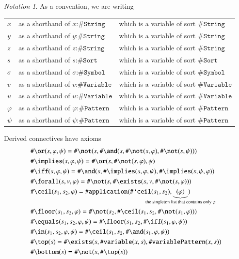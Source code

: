 \documentclass[UTF8,11pt]{article}
\newcounter{thmcounter}
\theoremstyle{plain}
\theoremstyle{definition}
\theoremstyle{remark}
\newtheorem{notation}   [thmcounter]{Notation}
\newcommand{\cln}{\texttt{:}}
\newcommand{\sharpsymbol}{\#}
\newcommand{\KString}{\texttt{\sharpsymbol String}}
\newcommand{\KSort}{\texttt{\sharpsymbol Sort}}
\newcommand{\KSymbol}{\texttt{\sharpsymbol Symbol}}
\newcommand{\KSymbolceil}{\texttt{\sharpsymbol `ceil}}
\newcommand{\KVariable}{\texttt{\sharpsymbol Variable}}
\newcommand{\KvariablePattern}{\texttt{\sharpsymbol variablePattern}}
\newcommand{\KPattern}{\texttt{\sharpsymbol Pattern}}
\newcommand{\Kvariable}{\texttt{\sharpsymbol variable}}
\newcommand{\Kand}{\texttt{\sharpsymbol  \slashsymbol and}}
\newcommand{\Kor}{\texttt{\sharpsymbol \slashsymbol  or}}
\newcommand{\Kimplies}{\texttt{\sharpsymbol  \slashsymbol implies}}
\newcommand{\Kiff}{\texttt{\sharpsymbol  \slashsymbol iff}}
\newcommand{\Knot}{\texttt{\sharpsymbol  \slashsymbol not}}
\newcommand{\Kapplication}{\texttt{\sharpsymbol application}}
\newcommand{\Kexists}{\texttt{\sharpsymbol \slashsymbol  exists}}
\newcommand{\Kforall}{\texttt{\sharpsymbol \slashsymbol  forall}}
\newcommand{\Kequals}{\texttt{\sharpsymbol \slashsymbol  equals}}
\newcommand{\Kmembership}{\Kin}
\newcommand{\Kin}{\texttt{\sharpsymbol \slashsymbol  in}}
\newcommand{\Ktop}{\texttt{\sharpsymbol \slashsymbol  top}}
\newcommand{\Kbottom}{\texttt{\sharpsymbol \slashsymbol  bottom}}
\newcommand{\Kfloor}{\texttt{\sharpsymbol \slashsymbol  floor}}
\newcommand{\Kceil}{\texttt{\sharpsymbol \slashsymbol  ceil}}
\newcommand{\slashsymbol}{\symbol{92}}
\begin{document}
\begin{notation}\label{notation:variables-about-KPattern}
 As a convention, we are writing
 \begin{center}
 \begin{tabular}{lll}
  $x$ & as a shorthand of $x \cln \KString$
  & which is a variable of sort $\KString$
  \\
  $y$ & as a shorthand of $y \cln \KString$
  & which is a variable of sort $\KString$
  \\
  $z$ & as a shorthand of $z \cln \KString$
  & which is a variable of sort $\KString$
  \\
  $s$ & as a shorthand of $s \cln \KSort$
  & which is a variable of sort $\KSort$
  \\
  $\sigma$ & as a shorthand of $\sigma \cln \KSymbol$
  & which is a variable of sort $\KSymbol$
  \\
  $v$ & as a shorthand of $v \cln \KVariable$
  & which is a variable of sort $\KVariable$
  \\
  $u$ & as a shorthand of $u \cln \KVariable$
  & which is a variable of sort $\KVariable$
  \\
  $\varphi$ & as a shorthand of $\varphi \cln \KPattern$
  & which is a variable of sort $\KPattern$
  \\
  $\psi$ & as a shorthand of $\psi \cln \KPattern$
  & which is a variable of sort $\KPattern$
 \end{tabular}
 \end{center}
\end{notation}

Derived connectives have axioms
\begin{align*}
  & \Kor(s, \varphi, \psi)
  = \Knot(s, \Kand(s, \Knot(s, \varphi), \Knot(s, \psi)))
  \\
  & \Kimplies(s, \varphi, \psi)
  = \Kor(s, \Knot(s, \varphi), \psi)
  \\
  & \Kiff(s, \varphi, \psi)
  = \Kand(s, \Kimplies(s, \varphi, \psi), \Kimplies(s, \psi, \varphi))
  \\
  & \Kforall(s, v, \varphi)
  = \Knot(s, \Kexists(s, v, \Knot(s, \varphi)))
  \\
  & \Kceil(s_1, s_2, \varphi) =
    \Kapplication(\KSymbolceil(s_1, s_2),
    \underbrace{(\varphi)}_{
     \mathclap{
      \text{the singleton list that contains only $\varphi$}}})
  \\
  & \Kfloor(s_1, s_2, \varphi)
  = \Knot(s_2, \Kceil(s_1, s_2, \Knot(s_1, \varphi)))
  \\
  & \Kequals(s_1, s_2, \varphi, \psi)
  = \Kfloor(s_1, s_2, \Kiff(s_1, \varphi, \psi))
  \\
  & \Kmembership(s_1, s_2, \varphi, \psi)
  = \Kceil(s_1, s_2, \Kand(s_1, \varphi, \psi))
  \\
  & \Ktop(s) = \Kexists(s, \Kvariable(x, s),
    \KvariablePattern(x, s))
  \\
  & \Kbottom(s) = \Knot(s, \Ktop(s))
\end{align*}
\end{document}
